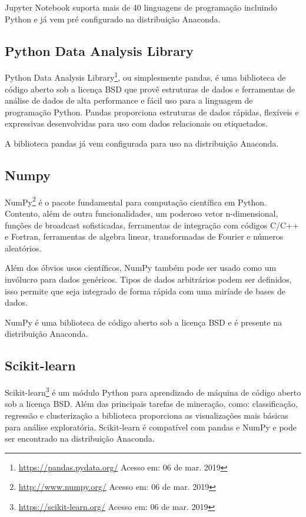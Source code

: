 Jupyter Notebook suporta mais de 40 linguagens de programação incluindo Python e
já vem pré configurado na distribuição Anaconda.

\subsection{Python Data Analysis Library}

Python Data Analysis Library\footnote{\url{https://pandas.pydata.org/} Acesso
em: 06 de mar. 2019}, ou simplesmente pandas, é uma biblioteca de código aberto
sob a licença BSD que provê estruturas de dados e ferramentas de análise de
dados de alta performance e fácil uso para a linguagem de programação Python.
Pandas proporciona estruturas de dados rápidas, flexíveis e expressivas
desenvolvidas para uso com dados relacionais ou etiquetados.

A biblioteca pandas já vem configurada para uso na distribuição Anaconda.

\subsection{Numpy}

NumPy\footnote{\url{http://www.numpy.org/} Acesso em: 06 de mar. 2019} é o
pacote fundamental para computação científica em Python. Contento, além de outra
funcionalidades, um poderoso vetor n-dimensional, funções de broadcast
sofisticadas, ferramentas de integração com códigos C/C++ e Fortran, ferramentas
de algebra linear, transformadas de Fourier e números aleatórios.

Além dos óbvios usos científicos, NumPy também pode ser usado como um invólucro
para dados genéricos. Tipos de dados arbitrários podem ser definidos, isso
permite que  seja integrado de forma rápida com uma miríade de bases de dados.

NumPy é uma biblioteca de código aberto sob a licença BSD e é presente na
distribuição Anaconda.

\subsection{Scikit-learn}

Scikit-learn\footnote{\url{https://scikit-learn.org/} Acesso em: 06 de mar.
2019} é um módulo Python para aprendizado de máquina de código aberto sob a
licença BSD. Além das principais tarefas de mineração, como: classificação,
regressão e clusterização a biblioteca proporciona as visualizações mais básicas
para análise exploratória. Scikit-learn é compatível com pandas e NumPy e pode
ser encontrado na distribuição Anaconda.
